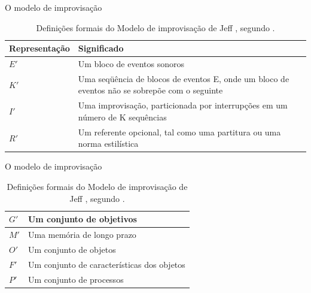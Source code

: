 \documentclass[aspectratio=169]{beamer}
\begin{document}
\begin{frame}{O modelo de improvisação}
\begin{table}[!h]
\caption{Definições formais do Modelo de improvisação de Jeff , segundo .}
\small
    \begin{tabular}{ | p{3cm} | p{5cm} |}
    \hline 
    \hline 

    \tiny{Representação}   
    & \tiny{Significado} \\
    \hline

    $E'$
    & \tiny{Um bloco de eventos sonoros} \\
    \hline

    $K'$
    & \tiny{Uma seqüência de blocos de eventos E, onde um bloco de eventos não se sobrepõe com o seguinte}\\
    \hline

    $I'$
    & \tiny{Uma improvisação, particionada por interrupções em um número de K sequências} \\
    \hline

    $R'$
    & \tiny{Um referente opcional, tal como uma partitura ou uma norma estilística} \\
    \hline
    \hline
   
    \end{tabular}
\label{tab:modelo_improvisacao}
\end{table}
\end{frame}

\begin{frame}{O modelo de improvisação}
\begin{table}[!h]
\caption{Definições formais do Modelo de improvisação de Jeff , segundo .}
\small
    \begin{tabular}{ | p{3cm} | p{5cm} |}
    \hline 
    \hline 
    $G'$
    & \tiny{Um conjunto de objetivos} \\
    \hline

    $M'$
    & \tiny{Uma memória de longo prazo} \\
    \hline

    $O'$
    & \tiny{Um conjunto de objetos} \\
    \hline

    $F'$
    & \tiny{Um conjunto de características dos objetos} \\
    \hline

    $P'$
    & \tiny{Um conjunto de processos} \\
    \hline
    \hline
   
    \end{tabular}
\label{tab:modelo_improvisacao}
\end{table}
\end{frame}
\end{document}
